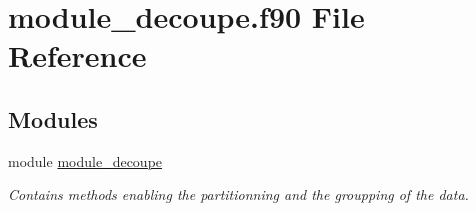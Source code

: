 \hypertarget{module__decoupe_8f90}{}\section{module\+\_\+decoupe.\+f90 File Reference}
\label{module__decoupe_8f90}
\subsection*{Modules}
\begin{DoxyCompactItemize}
\item 
module \hyperlink{namespacemodule__decoupe}{module\+\_\+decoupe}
\begin{DoxyCompactList}\small\item\em Contains methods enabling the partitionning and the groupping of the data. \end{DoxyCompactList}\end{DoxyCompactItemize}
